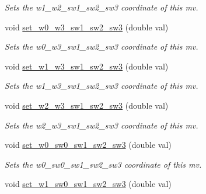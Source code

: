 \begin{DoxyCompactItemize}
\begin{DoxyCompactList}\small\item\em Sets the w1\-\_\-w2\-\_\-sw1\-\_\-sw2\-\_\-sw3 coordinate of this mv. \end{DoxyCompactList}\item 
\hypertarget{classe3ga_1_1mv_a16469f6a1ac710da9bdbb73643cce6ec}{void \hyperlink{classe3ga_1_1mv_a16469f6a1ac710da9bdbb73643cce6ec}{set\-\_\-w0\-\_\-w3\-\_\-sw1\-\_\-sw2\-\_\-sw3} (double val)}\label{classe3ga_1_1mv_a16469f6a1ac710da9bdbb73643cce6ec}

\begin{DoxyCompactList}\small\item\em Sets the w0\-\_\-w3\-\_\-sw1\-\_\-sw2\-\_\-sw3 coordinate of this mv. \end{DoxyCompactList}\item 
\hypertarget{classe3ga_1_1mv_a22069431343591f42fef403e0514b5dc}{void \hyperlink{classe3ga_1_1mv_a22069431343591f42fef403e0514b5dc}{set\-\_\-w1\-\_\-w3\-\_\-sw1\-\_\-sw2\-\_\-sw3} (double val)}\label{classe3ga_1_1mv_a22069431343591f42fef403e0514b5dc}

\begin{DoxyCompactList}\small\item\em Sets the w1\-\_\-w3\-\_\-sw1\-\_\-sw2\-\_\-sw3 coordinate of this mv. \end{DoxyCompactList}\item 
\hypertarget{classe3ga_1_1mv_ae9640e642539ab870b919bb296324409}{void \hyperlink{classe3ga_1_1mv_ae9640e642539ab870b919bb296324409}{set\-\_\-w2\-\_\-w3\-\_\-sw1\-\_\-sw2\-\_\-sw3} (double val)}\label{classe3ga_1_1mv_ae9640e642539ab870b919bb296324409}

\begin{DoxyCompactList}\small\item\em Sets the w2\-\_\-w3\-\_\-sw1\-\_\-sw2\-\_\-sw3 coordinate of this mv. \end{DoxyCompactList}\item 
\hypertarget{classe3ga_1_1mv_ad248fff0dbefa7b8f61d2173e82bc5fa}{void \hyperlink{classe3ga_1_1mv_ad248fff0dbefa7b8f61d2173e82bc5fa}{set\-\_\-w0\-\_\-sw0\-\_\-sw1\-\_\-sw2\-\_\-sw3} (double val)}\label{classe3ga_1_1mv_ad248fff0dbefa7b8f61d2173e82bc5fa}

\begin{DoxyCompactList}\small\item\em Sets the w0\-\_\-sw0\-\_\-sw1\-\_\-sw2\-\_\-sw3 coordinate of this mv. \end{DoxyCompactList}\item 
\hypertarget{classe3ga_1_1mv_aa7016f1e47c0646b9020d1239335cd90}{void \hyperlink{classe3ga_1_1mv_aa7016f1e47c0646b9020d1239335cd90}{set\-\_\-w1\-\_\-sw0\-\_\-sw1\-\_\-sw2\-\_\-sw3} (double val)}\label{classe3ga_1_1mv_aa7016f1e47c0646b9020d1239335cd90}


\end{DoxyCompactItemize}
